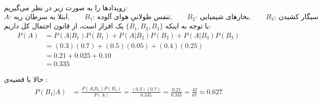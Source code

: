 رویدادها را به صورت زیر در نظر می‌گیریم:
\[
A:\ \text{ابتلا به سرطان ریه},\qquad
B_1:\ \text{تنفس طولانیِ هوای آلوده},\qquad
B_2:\ \text{بخارهای شیمیایی},\qquad
B_3:\ \text{سیگار کشیدن}
\]
با توجه به اینکه $\{B_1,B_2,B_3\}$ یک افراز است، از قانون احتمال کل داریم:
\begin{align*}
P(A) &= P(A|B_1)P(B_1)+P(A|B_2)P(B_2)+P(A|B_3)P(B_3)\\
&= (0.3)(0.7)+(0.5)(0.05)+(0.4)(0.25)\\
&= 0.21+0.025+0.10\\
&= 0.335
\end{align*}

حالا با قضیه‌ی :
\begin{align*}
P(B_1|A) &= \frac{P(A|B_1)P(B_1)}{P(A)}
= \frac{(0.3)(0.7)}{0.335}
= \frac{0.21}{0.335}
= \frac{42}{67}
\approx 0.627
\end{align*}